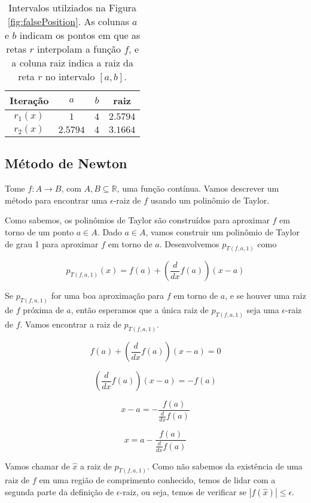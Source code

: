 \documentclass[]{article}
\numberwithin{equation}{section}
\begin{document}
\begin{table}[h]
  \centering
  \begin{tabular}{|c|c|c|c|}
    \hline
    Iteração & $a$ & $b$ & raiz \\ \hline
    $r_1(x)$ & $1$ & $4$ & $2.5794$ \\ \hline
    $r_2(x)$ & $2.5794$ & $4$ & $3.1664$ \\ \hline
  \end{tabular}
  \caption{Intervalos utilziados na Figura \ref{fig:falsePosition}.
    As colunas $a$ e $b$ indicam os pontos em que as retas $r$
    interpolam a função $f$, e a coluna raiz indica a raiz da reta $r$
    no intervalo $[a, b]$.}
  \label{tab:falsePosition}
\end{table}

\subsection{Método de Newton}

Tome $f : A \to B$, com $A, B \subseteq \mathbb{R}$, uma função
contínua. Vamos descrever um método para encontrar uma $\epsilon$-raiz
de $f$ usando um polinômio de Taylor.

Como sabemos, os polinômios de Taylor são construídos para aproximar
$f$ em torno de um ponto $a \in A$. Dado $a \in A$, vamos construir um
polinômio de Taylor de grau 1 para aproximar $f$ em torno de
$a$. Desenvolvemos $p_{T(f, a, 1)}$ como

$$
p_{T(f, a, 1)}(x) = f(a) + \left(\frac{d}{dx} f(a)\right) (x - a)
$$

Se $p_{T(f, a, 1)}$ for uma boa aproximação para $f$ em torno de $a$,
e se houver uma raiz de $f$ próxima de $a$, então esperamos que a
única raiz de $p_{T(f, a, 1)}$ seja uma $\epsilon$-raiz de $f$. Vamos
encontrar a raiz de $p_{T(f, a, 1)}$.

$$
f(a) + \left(\frac{d}{dx} f(a)\right) (x - a) = 0
$$

$$
\left(\frac{d}{dx} f(a)\right) (x - a) = -f(a)
$$

$$
x - a = - \frac{f(a)}{\frac{d}{dx} f(a)}
$$

$$
x = a - \frac{f(a)}{\frac{d}{dx} f(a)}
$$

Vamos chamar de $\hat{x}$ a raiz de $p_{T(f, a, 1)}$. Como não sabemos
da existência de uma raiz de $f$ em uma região de comprimento
conhecido, temos de lidar com a segunda parte da definição de
$\epsilon$-raiz, ou seja, temos de verificar se
$|f(\hat{x})| \leq \epsilon$.
\end{document}
